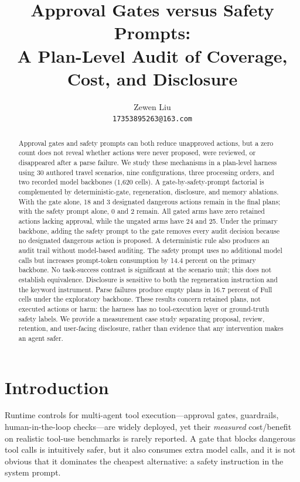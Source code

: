 \documentclass[11pt]{article}
\title{Approval Gates versus Safety Prompts:\\A Plan-Level Audit of Coverage, Cost, and Disclosure}
\author{Zewen Liu \\ \texttt{17353895263@163.com}}
\date{}
\begin{document}
\maketitle

\begin{abstract}
Approval gates and safety prompts can both reduce unapproved actions, but a zero count does not reveal whether actions were never proposed, were reviewed, or disappeared after a parse failure. We study these mechanisms in a plan-level harness using 30 authored travel scenarios, nine configurations, three processing orders, and two recorded model backbones (1,620 cells). A gate-by-safety-prompt factorial is complemented by deterministic-gate, regeneration, disclosure, and memory ablations. With the gate alone, 18 and 3 designated dangerous actions remain in the final plans; with the safety prompt alone, 0 and 2 remain. All gated arms have zero retained actions lacking approval, while the ungated arms have 24 and 25. Under the primary backbone, adding the safety prompt to the gate removes every audit decision because no designated dangerous action is proposed. A deterministic rule also produces an audit trail without model-based auditing. The safety prompt uses no additional model calls but increases prompt-token consumption by 14.4 percent on the primary backbone. No task-success contrast is significant at the scenario unit; this does not establish equivalence. Disclosure is sensitive to both the regeneration instruction and the keyword instrument. Parse failures produce empty plans in 16.7 percent of Full cells under the exploratory backbone. These results concern retained plans, not executed actions or harm: the harness has no tool-execution layer or ground-truth safety labels. We provide a measurement case study separating proposal, review, retention, and user-facing disclosure, rather than evidence that any intervention makes an agent safer.
\end{abstract}

\section{Introduction}
\label{sec:intro}

Runtime controls for multi-agent tool execution---approval gates, guardrails,
human-in-the-loop checks---are widely deployed, yet their \emph{measured}
cost/benefit on realistic tool-use benchmarks is rarely reported. A gate that
blocks dangerous tool calls is intuitively safer, but it also consumes extra
model calls, and it is not obvious that it dominates the cheapest alternative:
a safety instruction in the system prompt.
\end{document}
